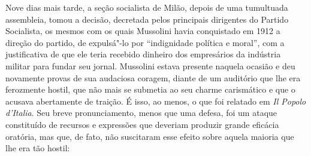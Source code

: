 Nove dias mais tarde, a seção socialista de Milão, depois de uma
tumultuada assembleia, tomou a decisão, decretada pelos principais
dirigentes do Partido Socialista, os mesmos com os quais Mussolini havia
conquistado em 1912 a direção do partido, de expulsá"-lo por
``indignidade política e moral'', com a justificativa de que ele teria
recebido dinheiro dos empresários da indústria militar para fundar seu
jornal. Mussolini estava presente naquela ocasião e deu novamente provas
de sua audaciosa coragem, diante de um auditório que lhe era ferozmente
hostil, que não mais se submetia ao seu charme carismático e que o
acusava abertamente de traição. É isso, ao menos, o que foi relatado em
\emph{Il Popolo d'Italia}. Seu breve pronunciamento, menos que uma
defesa, foi um ataque constituído de recursos e expressões que deveriam
produzir grande eficácia oratória, mas que, de fato, não suscitaram esse
efeito sobre aquela maioria que lhe era tão hostil:

